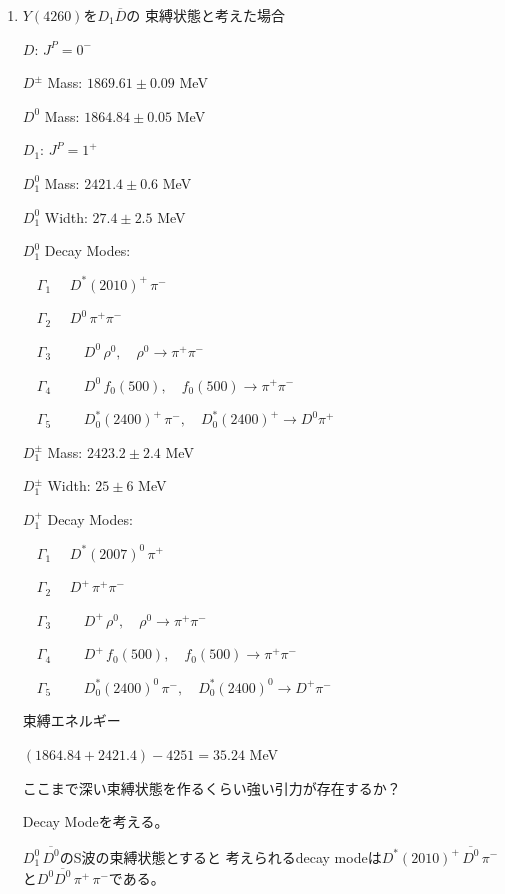 \documentclass[a4j]{jarticle}
\begin{document}
\begin{enumerate}
\item
$Y(4260)$を$D_1 \overline{D}$の
束縛状態と考えた場合

$D$: $J^{P} = 0^-$

$D^\pm$ Mass: $1869.61 \pm 0.09$ MeV

$D^0$ Mass: $1864.84 \pm 0.05$ MeV

\vspace*{5mm}

$D_1$: $J^{P} = 1^+$

$D_1^0$ Mass: $2421.4 \pm 0.6$ MeV

$D_1^0$ Width: $27.4 \pm 2.5$ MeV

\newpage

$D_1^0$ Decay Modes:


　$\Gamma_1 \quad$ $D^\ast(2010)^+ \, \pi^-$

　$\Gamma_2 \quad$ $D^0 \, \pi^+ \pi^-$

　$\Gamma_3 \quad \quad$ $D^0 \, \rho^0, \quad  \rho^0 \to \pi^+ \pi^-$

　$\Gamma_4 \quad \quad$ $D^0 \, f_0(500), \quad  f_0(500) \to \pi^+ \pi^-$
 
　$\Gamma_5 \quad \quad$ $D_0^\ast(2400)^+ \, \pi^-, \quad  D_0^\ast(2400)^+ \to D^0 \pi^+$

\vspace*{5mm}

$D_1^\pm$ Mass: $2423.2 \pm 2.4$ MeV

$D_1^\pm$ Width: $25 \pm 6$ MeV

$D_1^+$ Decay Modes:


　$\Gamma_1 \quad$ $D^\ast(2007)^0 \, \pi^+$

　$\Gamma_2 \quad$ $D^+ \, \pi^+ \pi^-$

　$\Gamma_3 \quad \quad$ $D^+ \, \rho^0, \quad  \rho^0 \to \pi^+ \pi^-$

　$\Gamma_4 \quad \quad$ $D^+ \, f_0(500), \quad  f_0(500) \to \pi^+ \pi^-$
 
　$\Gamma_5 \quad \quad$ $D_0^{\ast}(2400)^0 \, \pi^-, \quad  D_0^\ast(2400)^0 \to D^+ \pi^-$

\vspace*{5mm}
束縛エネルギー　　

$(1864.84 + 2421.4) - 4251 = 35.24$ MeV

ここまで深い束縛状態を作るくらい強い引力が存在するか？

Decay Modeを考える。

$D_1^0 \, \overline{D^0}$のS波の束縛状態とすると
考えられるdecay modeは$D^\ast(2010)^+ \, \overline{D^0} \, \pi^-$と$D^0 \overline{D^0} \, \pi^+ \, \pi^-$である。


\end{enumerate}
\end{document}
